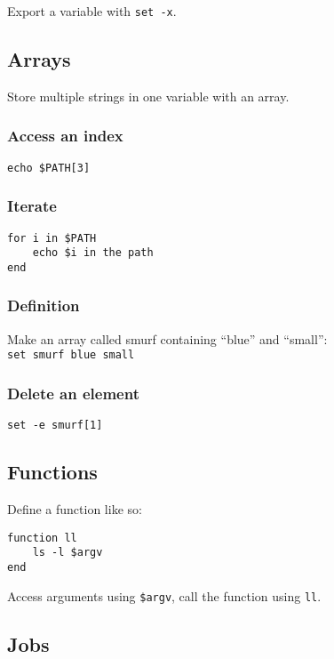 \documentclass[10pt]{extarticle}
\begin{document}
\begin{paracol}{2}
Export a variable with \texttt{set -x}.

\subsection*{Arrays}

Store multiple strings in one variable with an array.

\subsubsection*{Access an index}

\texttt{echo \$PATH[3]}

\subsubsection*{Iterate}

\begin{verbatim}
for i in $PATH
    echo $i in the path
end
\end{verbatim}

\subsubsection*{Definition}

Make an array called smurf containing ``blue'' and ``small'':\\

\texttt{set smurf blue small}

\subsubsection*{Delete an element}

\texttt{set -e smurf[1]}

\subsection*{Functions}

Define a function like so:\\

\begin{verbatim}
function ll
    ls -l $argv
end
\end{verbatim}

Access arguments using \texttt{\$argv}, call the function using \texttt{ll}.

\subsection*{Jobs}


\end{paracol}
\end{document}
